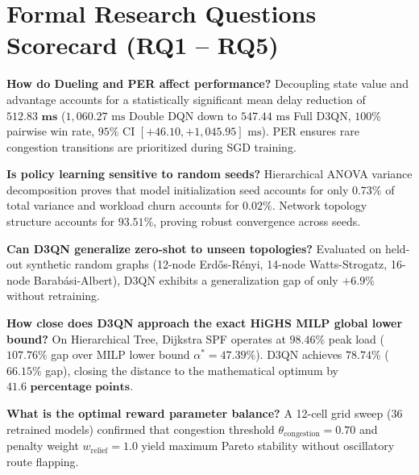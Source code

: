 \documentclass[10pt,a4paper]{article}
\begin{document}
\vspace{-3mm}
\section{Formal Research Questions Scorecard (RQ1 -- RQ5)}

\begin{tcolorbox}[colframe=uotblue,title=\textbf{Summary of Formal Empirical Findings},left=1.5mm,right=1.5mm,top=1mm,bottom=1mm]
\footnotesize
\begin{description}[leftmargin=!,labelwidth=16mm,itemsep=0.8pt]
  \item[\textbf{RQ1 (Ablation):}] \textbf{How do Dueling and PER affect performance?} Decoupling state value and advantage accounts for a statistically significant mean delay reduction of $\mathbf{512.83\text{ ms}}$ ($1{,}060.27\text{ ms}$ Double DQN down to $547.44\text{ ms}$ Full D3QN, $100\%$ pairwise win rate, $95\%\text{ CI } [+46.10, +1{,}045.95]\text{ ms}$). PER ensures rare congestion transitions are prioritized during SGD training.
  \item[\textbf{RQ2 (Stability):}] \textbf{Is policy learning sensitive to random seeds?} Hierarchical ANOVA variance decomposition proves that model initialization seed accounts for only $\mathbf{0.73\%}$ of total variance and workload churn accounts for $\mathbf{0.02\%}$. Network topology structure accounts for $\mathbf{93.51\%}$, proving robust convergence across seeds.
  \item[\textbf{RQ3 (Transfer):}] \textbf{Can D3QN generalize zero-shot to unseen topologies?} Evaluated on held-out synthetic random graphs (12-node Erd\H{o}s-R\'{e}nyi, 14-node Watts-Strogatz, 16-node Barab\'{a}si-Albert), D3QN exhibits a generalization gap of only $\mathbf{+6.9\%}$ without retraining.
  \item[\textbf{RQ4 (Oracle Gap):}] \textbf{How close does D3QN approach the exact HiGHS MILP global lower bound?} On Hierarchical Tree, Dijkstra SPF operates at $98.46\%$ peak load ($107.76\%$ gap over MILP lower bound $\alpha^* = 47.39\%$). D3QN achieves $78.74\%$ ($66.15\%$ gap), closing the distance to the mathematical optimum by $\mathbf{41.6\text{ percentage points}}$.
  \item[\textbf{RQ5 (Sensitivity):}] \textbf{What is the optimal reward parameter balance?} A 12-cell grid sweep (36 retrained models) confirmed that congestion threshold $\theta_{\mathrm{congestion}} = 0.70$ and penalty weight $w_{\mathrm{relief}} = 1.0$ yield maximum Pareto stability without oscillatory route flapping.
\end{description}
\end{tcolorbox}
\end{document}

